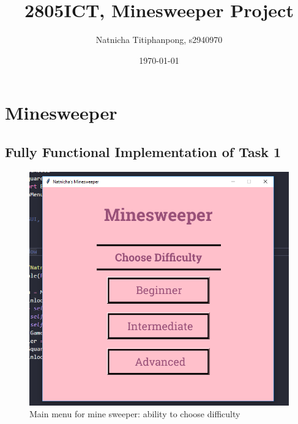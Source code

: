 \documentclass[12pt, a4]{report}
\title{2805ICT, Minesweeper Project}
\author{Natnicha Titiphanpong, s2940970}%
\date{\today}
\begin{document}
\begin{titlepage}
	\maketitle 
\end{titlepage}
	\tableofcontents
	\pagebreak
	\section{Minesweeper} 
	\subsection{Fully Functional Implementation of Task 1}
		\begin{figure}[!h]
			\centering
			\includegraphics[scale=0.7]{menu}
			\caption{Main menu for mine sweeper: ability to choose difficulty}
		\end{figure}
	
\end{document}
